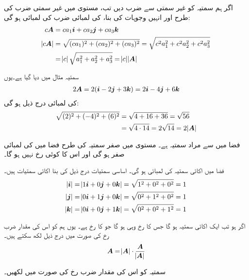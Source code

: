 اگر ہم سمتیہ  کو غیر سمتی  سے ضرب دیں تب، مستوی میں غیر سمتی ضرب کی طرح اور انہیں وجوہات کی بنا،   کی لمبائی  ضرب  کی لمبائی ہو گی:
\begin{gather}
\begin{aligned}
c{{\boldsymbol{A}}}&=ca_1{\boldsymbol{i}}+ca_2{\boldsymbol{j}}+ca_3{\boldsymbol{k}}\\
\abs{c{{\boldsymbol{A}}}}&=\sqrt{(ca_1)^2+(ca_2)^2+(ca_3)^2}=\sqrt{c^2a_1^2+c^2a_2^2+c^2a_3^2}\\
&=\abs{c}\sqrt{a_1^2+a_2^2+a_3^2}=\abs{c}\abs{{{\boldsymbol{A}}}}
\end{aligned}
\end{gather}

سمتیہ  مثال  میں دیا گیا ہے۔یوں 
\begin{align*}
2{{\boldsymbol{A}}}=2({\boldsymbol{i}}-2{\boldsymbol{j}}+3{\boldsymbol{k}})=2{\boldsymbol{i}}-4{\boldsymbol{j}}+6{\boldsymbol{k}}
\end{align*}
کی لمبائی درج ذیل ہو گی:
\begin{align*}
\sqrt{(2)^2+(-4)^2+(6)^2}&=\sqrt{4+16+36}=\sqrt{56}\\
&=\sqrt{4\cdot 14}=2\sqrt{14}=2\abs{{{\boldsymbol{A}}}}
\end{align*}

فضا میں  سے مراد سمتیہ  ہے۔ مستوی میں صفر سمتیہ کی طرح فضا میں  کی لمبائی صفر ہو گی اور اس کا کوئی رخ نہیں ہو گا۔

فضا میں اکائی سمتیہ کی لمبائی  ہو گی۔ اساسی سمتیات درج ذیل کی بنا اکائی سمتیات ہیں۔
\begin{align*}
\abs{{\boldsymbol{i}}}&=\abs{1{\boldsymbol{i}}+0{\boldsymbol{j}}+0{\boldsymbol{k}}}=\sqrt{1^2+0^2+0^2}=1\\
\abs{{\boldsymbol{j}}}&=\abs{0{\boldsymbol{i}}+1{\boldsymbol{j}}+0{\boldsymbol{k}}}=\sqrt{0^2+1^2+0^2}=1\\
\abs{{\boldsymbol{k}}}&=\abs{0{\boldsymbol{i}}+0{\boldsymbol{j}}+1{\boldsymbol{k}}}=\sqrt{0^2+0^2+1^2}=1
\end{align*}

اگر  ہو تب  ایک اکائی سمتیہ ہو گا جس کا رخ وہی ہو گا جو  کا رخ ہے۔ یوں ہم  کو اس کی مقدار ضرب رخ کی صورت میں درج ذیل لکھ سکتے ہیں۔
\begin{align}\label{مساوات_سمتیہ_فضا_لمبائی_ضرب_رخ}
{\ensuremath{{\boldsymbol{A}}}}=\abs{{{\boldsymbol{A}}}}\cdot\frac{{{\boldsymbol{A}}}}{\abs{{{\boldsymbol{A}}}}}
\end{align}

سمتیہ  کو اس کی مقدار ضرب رخ کی صورت میں لکھیں۔

